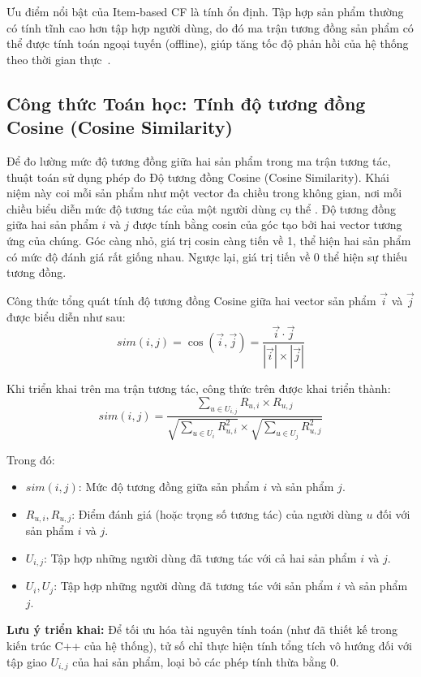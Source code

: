 \documentclass{report}
\begin{document}
Ưu điểm nổi bật của Item-based CF là tính ổn định. Tập hợp sản phẩm thường có tính tĩnh cao hơn tập hợp người dùng, do đó ma trận tương đồng sản phẩm có thể được tính toán ngoại tuyến (offline), giúp tăng tốc độ phản hồi của hệ thống theo thời gian thực~\cite{sarwar2001item}.

\subsection{Công thức Toán học: Tính độ tương đồng Cosine (Cosine Similarity)}

Để đo lường mức độ tương đồng giữa hai sản phẩm trong ma trận tương tác, thuật toán sử dụng phép đo Độ tương đồng Cosine (Cosine Similarity). Khái niệm này coi mỗi sản phẩm như một vector đa chiều trong không gian, nơi mỗi chiều biểu diễn mức độ tương tác của một người dùng cụ thể \cite{ricci2011introduction}. Độ tương đồng giữa hai sản phẩm $i$ và $j$ được tính bằng cosin của góc tạo bởi hai vector tương ứng của chúng. Góc càng nhỏ, giá trị cosin càng tiến về 1, thể hiện hai sản phẩm có mức độ đánh giá rất giống nhau. Ngược lại, giá trị tiến về 0 thể hiện sự thiếu tương đồng.

Công thức tổng quát tính độ tương đồng Cosine giữa hai vector sản phẩm $\vec{i}$ và $\vec{j}$ được biểu diễn như sau:
$$sim(i, j) = \cos(\vec{i}, \vec{j}) = \frac{\vec{i} \cdot \vec{j}}{|\vec{i}| \times |\vec{j}|}$$

Khi triển khai trên ma trận tương tác, công thức trên được khai triển thành:
$$sim(i, j) = \frac{\sum_{u \in U_{i,j}} R_{u,i} \times R_{u,j}}{\sqrt{\sum_{u \in U_i} R_{u,i}^2} \times \sqrt{\sum_{u \in U_j} R_{u,j}^2}}$$

Trong đó:
\begin{itemize}
    \item $sim(i, j)$: Mức độ tương đồng giữa sản phẩm $i$ và sản phẩm $j$.
    \item $R_{u,i}, R_{u,j}$: Điểm đánh giá (hoặc trọng số tương tác) của người dùng $u$ đối với sản phẩm $i$ và $j$.
    \item $U_{i,j}$: Tập hợp những người dùng đã tương tác với cả hai sản phẩm $i$ và $j$.
    \item $U_i, U_j$: Tập hợp những người dùng đã tương tác với sản phẩm $i$ và sản phẩm $j$.
\end{itemize}

\textbf{Lưu ý triển khai:} Để tối ưu hóa tài nguyên tính toán (như đã thiết kế trong kiến trúc C++ của hệ thống), tử số chỉ thực hiện tính tổng tích vô hướng đối với tập giao $U_{i,j}$ của hai sản phẩm, loại bỏ các phép tính thừa bằng 0.
\end{document}
